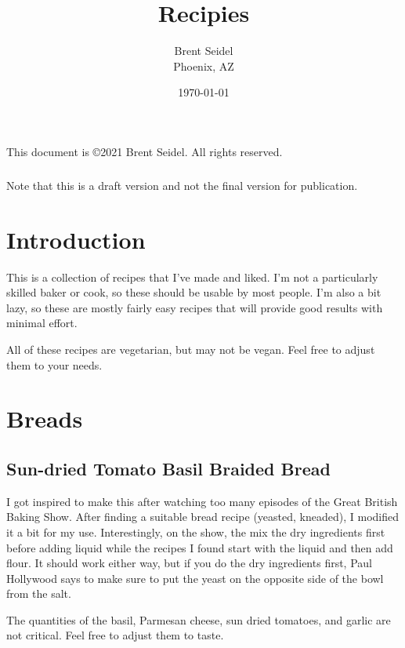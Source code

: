 \documentclass[10pt, openany]{book}
\title{Recipies}
\author{Brent Seidel \\ Phoenix, AZ}
\date{ \today }
\begin{document}
%
%
\frontmatter
\maketitle
\begin{center}
This document is \copyright 2021 Brent Seidel.  All rights reserved.

\paragraph{}Note that this is a draft version and not the final version for publication.
\end{center}
\tableofcontents

\mainmatter
\chapter{Introduction}
This is a collection of recipes that I've made and liked.  I'm not a particularly skilled baker or cook, so these should be usable by most people.  I'm also a bit lazy, so these are mostly fairly easy recipes that will provide good results with minimal effort.

All of these recipes are vegetarian, but may not be vegan.  Feel free to adjust them to your needs.

\chapter{Breads}
\section{Sun-dried Tomato Basil Braided Bread}
I got inspired to make this after watching too many episodes of the Great British Baking Show.  After finding a suitable bread recipe (yeasted, kneaded), I modified it a bit for my use.  Interestingly, on the show, the mix the dry ingredients first before adding liquid while the recipes I found start with the liquid and then add flour.  It should work either way, but if you do the dry ingredients first, Paul Hollywood says to make sure to put the yeast on the opposite side of the bowl from the salt.

The quantities of the basil, Parmesan cheese, sun dried tomatoes, and garlic are not critical.  Feel free to adjust them to taste.
\end{document}

